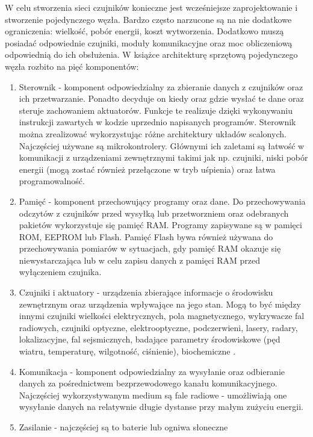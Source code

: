 W celu stworzenia sieci czujników konieczne jest wcześniejsze zaprojektowanie i stworzenie pojedynczego węzła. Bardzo często narzucone są na nie dodatkowe ograniczenia: wielkość, pobór energii, koszt wytworzenia. Dodatkowo muszą posiadać odpowiednie czujniki, moduły komunikacyjne oraz moc obliczeniową odpowiednią do ich obsłużenia. W książce \cite{Karl2006} architekturę sprzętową pojedynczego węzła rozbito na pięć komponentów:
\begin{enumerate}
	\item Sterownik - komponent odpowiedzialny za zbieranie danych z czujników oraz ich przetwarzanie. Ponadto decyduje on kiedy oraz gdzie wysłać te dane oraz steruje zachowaniem aktuatorów. Funkcje te realizuje dzięki wykonywaniu instrukcji zawartych w kodzie uprzednio napisanych programów. Sterownik można zrealizować wykorzystując różne architektury układów scalonych. Najczęściej używane są mikrokontrolery. Głównymi ich zaletami są łatwość w komunikacji z urządzeniami zewnętrznymi takimi jak np. czujniki, niski pobór energii (mogą zostać również przełączone w tryb uśpienia) oraz łatwa programowalność.
	\item Pamięć - komponent przechowujący programy oraz dane. Do przechowywania odczytów z czujników przed wysyłką lub przetworzniem oraz odebranych pakietów wykorzystuje się pamięć RAM. Programy zapisywane są w pamięci ROM, EEPROM lub Flash. Pamięć Flash bywa również używana do przechowywania pomiarów w sytuacjach, gdy pamięć RAM okazuje się niewystarczająca lub w celu zapisu danych z pamięci RAM przed wyłączeniem czujnika.   
	\item Czujniki i aktuatory - urządzenia zbierające informacje o środowisku zewnętrznym oraz urządzenia wpływające na jego stan. Mogą to być między innymi czujniki wielkości elektrycznych, pola magnetycznego, wykrywacze fal radiowych, czujniki optyczne, elektrooptyczne, podczerwieni, lasery, radary, lokalizacyjne, fal sejsmicznych, badające parametry środowiskowe (pęd wiatru, temperaturę, wilgotność, ciśnienie), biochemiczne \cite{Sohraby2006}.
	\item Komunikacja - komponent odpowiedzialny za wysyłanie oraz odbieranie danych za pośrednictwem bezprzewodowego kanału komunikacyjnego. Najczęściej wykorzystywanym medium są fale radiowe - umożliwiają one wysyłanie danych na relatywnie długie dystanse przy małym zużyciu energii. 
	\item Zasilanie - najczęściej są to baterie lub ogniwa słoneczne
\end{enumerate}

